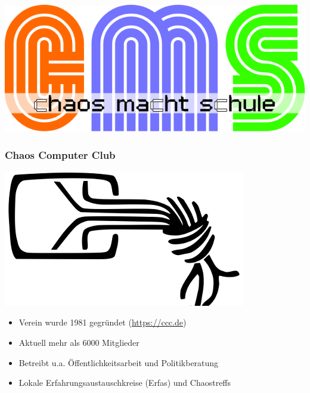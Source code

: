 \documentclass[12pt]{beamer}
\begin{document}
\begin{frame}
	\begin{center}
    	\includegraphics[height=0.5\textheight]{img/cms-text.png}
    \end{center}
\end{frame}

\begin{frame}
	\frametitle{Chaos Computer Club}
	\begin{center}
		\includegraphics[height=0.2\textheight]{img/chaosknoten.png}
	\end{center}	
	\begin{itemize}
		\item<1-> Verein wurde 1981 gegründet (\url{https://ccc.de})          
		\item<2-> Aktuell mehr als 6000 Mitglieder
		\item<3-> Betreibt u.a. Öffentlichkeitsarbeit und Politikberatung      
		\item<4-> Lokale Erfahrungsaustauschkreise (Erfas) und Chaostreffs
	\end{itemize}
\end{frame}
\end{document}
